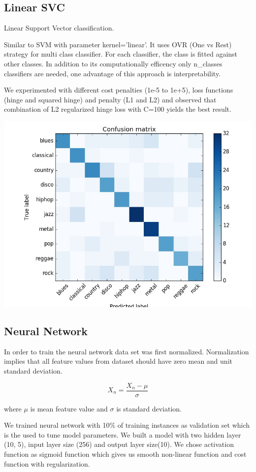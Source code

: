 \documentclass[conference]{IEEEtran}
\begin{document}
\subsection{Linear SVC}
\label{sub:Linear SVC}

Linear Support Vector classification.

Similar to SVM with parameter kernel='linear'. It uses OVR (One vs Rest) strategy for multi class classifier. For each classifier, the class is fitted against other classes. In addition to its computationally efficency only n{\_}classes classifiers are needed, one advantage of this approach is interpretability.

 We experimented with different cost penalties (1e-5 to 1e+5), loss functions (hinge and squared hinge) and penalty (L1 and L2) and observed that combination of L2 regularized hinge loss with C=100 yields the best result.

\includegraphics[width=\columnwidth]{LINEARSVC}

\subsection{Neural Network}
\label{sub:Neural Network}
In order to train the neural network data set was first normalized. Normalization implies that all feature values from dataset should have zero mean and unit standard deviation.

$$ X_n = \frac{X_n - \mu}{\sigma}$$

where $\mu$ is mean feature value and $ \sigma $ is standard deviation.

We trained neural network with 10\% of training instances as validation set which is the used to tune model parameters. We built a model with two hidden layer (10, 5), input layer size (256) and output layer size(10). We chose activation function as sigmoid function which gives us smooth non-linear function and cost function with regularization.
\end{document}
